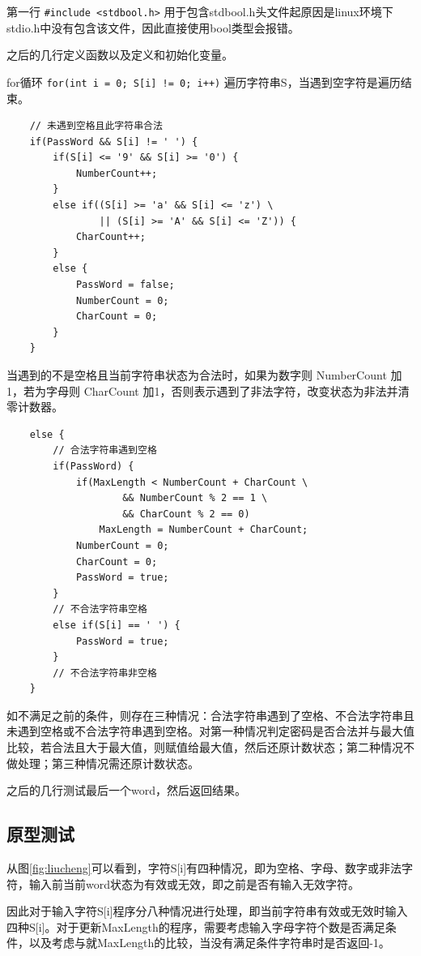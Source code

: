 \begin{spacing}{1.5}
    第一行 \lstinline{#include <stdbool.h>} 用于包含stdbool.h头文件起原因是linux环境下stdio.h中没有包含该文件，因此直接使用bool类型会报错。
    
    之后的几行定义函数以及定义和初始化变量。

    for循环 \lstinline{for(int i = 0; S[i] != 0; i++)} 遍历字符串S，当遇到空字符是遍历结束。
\begin{lstlisting}
    // 未遇到空格且此字符串合法
    if(PassWord && S[i] != ' ') {
        if(S[i] <= '9' && S[i] >= '0') {
            NumberCount++;
        }
        else if((S[i] >= 'a' && S[i] <= 'z') \
                || (S[i] >= 'A' && S[i] <= 'Z')) {
            CharCount++;
        }
        else {
            PassWord = false;
            NumberCount = 0;
            CharCount = 0;
        }
    }
\end{lstlisting}

    当遇到的不是空格且当前字符串状态为合法时，如果为数字则 NumberCount 加1，若为字母则 CharCount 加1，否则表示遇到了非法字符，改变状态为非法并清零计数器。
\begin{lstlisting}
    else {
        // 合法字符串遇到空格
        if(PassWord) {
            if(MaxLength < NumberCount + CharCount \
                    && NumberCount % 2 == 1 \
                    && CharCount % 2 == 0)
                MaxLength = NumberCount + CharCount;
            NumberCount = 0;
            CharCount = 0;
            PassWord = true;
        }
        // 不合法字符串空格
        else if(S[i] == ' ') {
            PassWord = true;
        }
        // 不合法字符串非空格
    }
\end{lstlisting}

    如不满足之前的条件，则存在三种情况：合法字符串遇到了空格、不合法字符串且未遇到空格或不合法字符串遇到空格。对第一种情况判定密码是否合法并与最大值比较，若合法且大于最大值，则赋值给最大值，然后还原计数状态；第二种情况不做处理；第三种情况需还原计数状态。

    之后的几行测试最后一个word，然后返回结果。

    \subsection{原型测试}
    从图\ref{fig:liucheng}可以看到，字符S[i]有四种情况，即为空格、字母、数字或非法字符，输入前当前word状态为有效或无效，即之前是否有输入无效字符。
    
    因此对于输入字符S[i]程序分八种情况进行处理，即当前字符串有效或无效时输入四种S[i]。对于更新MaxLength的程序，需要考虑输入字母字符个数是否满足条件，以及考虑与就MaxLength的比较，当没有满足条件字符串时是否返回-1。


\end{spacing}
